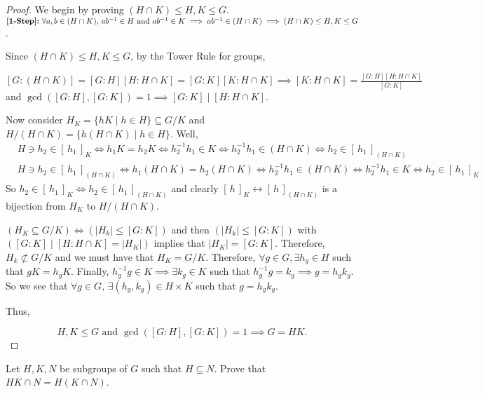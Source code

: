 \documentclass[addpoints,10pt]{exam}
\theoremstyle{plain}
\theoremstyle{definition}
\newtheorem{prob}[thm]{Problem}
\theoremstyle{plain}
\theoremstyle{plain}
\theoremstyle{definition}
\let\oldprob\prob
\let\endoldprob\endprob
\renewenvironment{prob}
  {\begin{singlespace}\oldprob}
  {\endoldprob\end{singlespace}}
\newcommand{\belowtitle}{\leavevmode\newline}
\newcommand{\Observe}{\text{Observe.}}
\newcommand{\class}[2][]{\ensuremath{\left[\,#2\,\right]_{#1}}}
\begin{document}
\begin{proof}
  We begin by proving $(H\cap K)\leq H,K\leq G$.\belowtitle
  $\textbf{[1-Step]:\;}\forall a,b\in (H\cap K),\,ab^{-1}\in H\text{ and }ab^{-1}\in K\implies ab^{-1}\in (H\cap K)\implies (H\cap K)\leq H,K\leq G$.

  Since $(H\cap K)\leq H,K \leq G$, by the Tower Rule for groups,
  \begin{center}
    $[G:(H\cap K)]=[G:H][H:H\cap K]=[G:K][K:H\cap K]\implies [K:H\cap K]=\frac{[G:H][H:H\cap K]}{[G:K]}$\newline
    and $\gcd([G:H],[G:K])=1\implies [G:K]\mid [H:H\cap K]$.
  \end{center}

  Now consider $H_{K}=\{hK\mid h\in H\}\subseteq G/K$ and $H/(H\cap K)=\{h(H\cap K)\mid h\in H\}$. Well,
  \begin{align*}
    &H \ni h_{2}\in \class[K]{h_{1}}\iff h_{1}K=h_{2}K\iff h_{2}^{-1}h_{1}\in K\iff h_{2}^{-1}h_{1}\in (H\cap K)\iff h_{2}\in \class[(H\cap K)]{h_{1}}\\
    &H \ni h_{2}\in \class[(H\cap K)]{h_{1}}\iff h_{1}(H\cap K)=h_{2}(H\cap K)\iff h_{2}^{-1}h_{1}\in (H\cap K)\iff h_{2}^{-1}h_{1}\in K\iff h_{2}\in \class[K]{h_{1}}
  \end{align*}
  So $h_{2}\in \class[K]{h_{1}}\iff h_{2}\in \class[(H\cap K)]{h_{1}}$ and clearly $\class[K]{h}\leftrightarrow\class[(H\cap K)]{h}$ is a bijection from $H_{K}$ to $H/(H\cap K)$.
  \Observe

  $(H_{K}\subseteq G/K)\iff (|H_{k}|\leq [G:K])$ and then $(|H_{k}|\leq [G:K])$ with $([G:K]\mid [H:H\cap K]=|H_{K}|)$ implies that $|H_{K}|=[G:K].$ Therefore, $H_{k}\not\subset G/K$ and we must have that $ H_{K}=G/K.$ Therefore, $\forall g\in G,\exists h_{g}\in H$ such that $gK=h_{g}K$. Finally, $h_{g}^{-1}g\in K\implies \exists k_{g}\in K$ such that $h_{g}^{-1}g=k_{g}\implies g=h_{g}k_{g}$. So we see that $\forall g\in G,\,\exists (h_{g},k_{g})\in H\times K$ such that $g=h_{g}k_{g}$.

  Thus,

  $$H,K\leq G\text{ and }\gcd([G:H],[G:K])=1\implies G=HK.$$

\end{proof}
\newpage

\begin{prob}
  Let $H,K,N$ be subgroups of $G$ such that $H\subseteq N$. Prove that $HK\cap N = H(K\cap N)$.
\end{prob}
\end{document}
